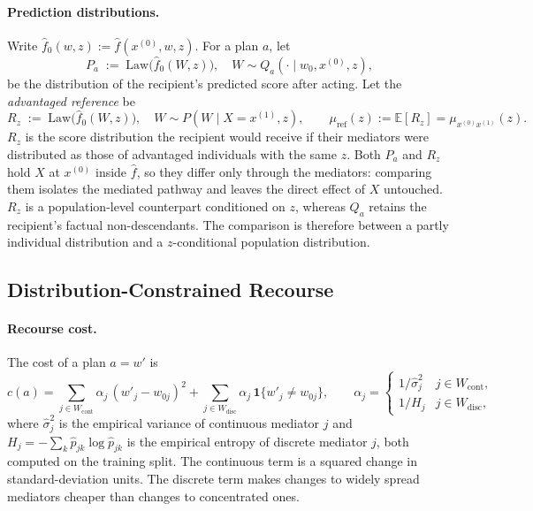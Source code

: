 \paragraph{Prediction distributions.}
Write $\hat f_0(w,z):=\hat f(x^{(0)},w,z)$. For a plan $a$, let
\begin{equation}
  P_a\;:=\;\mathrm{Law}\bigl(\hat f_0(W,z)\bigr),\quad W\sim Q_a(\cdot\mid w_0,x^{(0)},z),
  \label{eq:plan_law}
\end{equation}
be the distribution of the recipient's predicted score after acting. Let the
\emph{advantaged reference} be
\begin{equation}
  R_z\;:=\;\mathrm{Law}\bigl(\hat f_0(W,z)\bigr),\quad W\sim P(W\mid X=x^{(1)},z),
  \qquad
  \mu_{\mathrm{ref}}(z):=\mathbb E[R_z]=\mu_{x^{(0)}x^{(1)}}(z).
  \label{eq:reference}
\end{equation}
$R_z$ is the score distribution the recipient would receive if their mediators
were distributed as those of advantaged individuals with the same $z$. Both
$P_a$ and $R_z$ hold $X$ at $x^{(0)}$ inside $\hat f$, so they differ only
through the mediators: comparing them isolates the mediated pathway and leaves
the direct effect of $X$ untouched. $R_z$ is a population-level counterpart
conditioned on $z$, whereas $Q_a$ retains the recipient's factual
non-descendants. The comparison is therefore between a partly individual
distribution and a $z$-conditional population distribution.

\subsection{Distribution-Constrained Recourse}
\label{sec:recourse_selection}

\paragraph{Recourse cost.}
The cost of a plan $a=w'$ is
\begin{equation}
  c(a)=\sum_{j\in W_{\mathrm{cont}}}\alpha_j\,(w'_j-w_{0j})^2
  +\sum_{j\in W_{\mathrm{disc}}}\alpha_j\,\mathbf 1\{w'_j\ne w_{0j}\},
  \qquad
  \alpha_j=\begin{cases}
    1/\hat\sigma_j^2 & j\in W_{\mathrm{cont}},\\
    1/H_j & j\in W_{\mathrm{disc}},
  \end{cases}
  \label{eq:cost}
\end{equation}
where $\hat\sigma^2_j$ is the empirical variance of continuous mediator $j$
and $H_j=-\sum_k\hat p_{jk}\log\hat p_{jk}$ is the empirical entropy of discrete
mediator $j$, both computed on the training split. The continuous term is a
squared change in standard-deviation units. The discrete term makes changes to
widely spread mediators cheaper than changes to concentrated ones.


